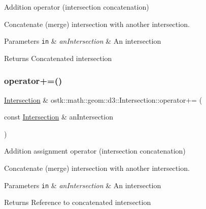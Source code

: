 Addition operator (intersection concatenation) 

Concatenate (merge) intersection with another intersection.


\begin{DoxyParams}[1]{Parameters}
\mbox{\tt in}  & {\em an\+Intersection} & An intersection \\
\hline
\end{DoxyParams}
\begin{DoxyReturn}{Returns}
Concatenated intersection 
\end{DoxyReturn}
\mbox{\label{classostk_1_1math_1_1geom_1_1d3_1_1_intersection_aad0c837021af295414bcc533571bd1ae}} 
\subsubsection{\texorpdfstring{operator+=()}{operator+=()}}
{\footnotesize\ttfamily \hyperlink{classostk_1_1math_1_1geom_1_1d3_1_1_intersection}{Intersection} \& ostk\+::math\+::geom\+::d3\+::\+Intersection\+::operator+= (\begin{DoxyParamCaption}\item[{const \hyperlink{classostk_1_1math_1_1geom_1_1d3_1_1_intersection}{Intersection} \&}]{an\+Intersection }\end{DoxyParamCaption})}



Addition assignment operator (intersection concatenation) 

Concatenate (merge) intersection with another intersection.


\begin{DoxyParams}[1]{Parameters}
\mbox{\tt in}  & {\em an\+Intersection} & An intersection \\
\hline
\end{DoxyParams}
\begin{DoxyReturn}{Returns}
Reference to concatenated intersection 
\end{DoxyReturn}
\mbox{\label{classostk_1_1math_1_1geom_1_1d3_1_1_intersection_a1f8d1f1b0554f31e797957800531d5fd}} 
